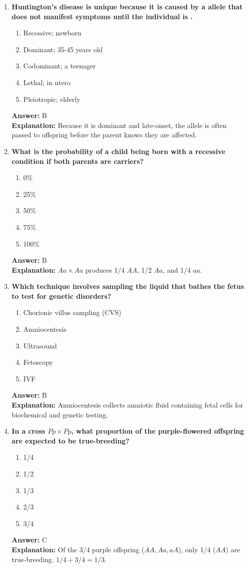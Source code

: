 \documentclass[11pt, a4paper]{article}
\begin{document}
\begin{enumerate}[leftmargin=*, label=\arabic*.]
\item \textbf{Huntington's disease is unique because it is caused by a \underline{\hspace{1cm}} allele that does not manifest symptoms until the individual is \underline{\hspace{1cm}}.}
\begin{enumerate}[label=\Alph*.]
\item Recessive; newborn
\item Dominant; 35-45 years old
\item Codominant; a teenager
\item Lethal; in utero
\item Pleiotropic; elderly
\end{enumerate}
\textbf{Answer:} B \\
\textbf{Explanation:} Because it is dominant and late-onset, the allele is often passed to offspring before the parent knows they are affected.

\item \textbf{What is the probability of a child being born with a recessive condition if both parents are carriers?}
\begin{enumerate}[label=\Alph*.]
\item 0\%
\item 25\%
\item 50\%
\item 75\%
\item 100\%
\end{enumerate}
\textbf{Answer:} B \\
\textbf{Explanation:} $Aa \times Aa$ produces 1/4 $AA$, 1/2 $Aa$, and 1/4 $aa$.

\item \textbf{Which technique involves sampling the liquid that bathes the fetus to test for genetic disorders?}
\begin{enumerate}[label=\Alph*.]
\item Chorionic villus sampling (CVS)
\item Amniocentesis
\item Ultrasound
\item Fetoscopy
\item IVF
\end{enumerate}
\textbf{Answer:} B \\
\textbf{Explanation:} Amniocentesis collects amniotic fluid containing fetal cells for biochemical and genetic testing.

\item \textbf{In a cross $Pp \times Pp$, what proportion of the purple-flowered offspring are expected to be true-breeding?}
\begin{enumerate}[label=\Alph*.]
\item 1/4
\item 1/2
\item 1/3
\item 2/3
\item 3/4
\end{enumerate}
\textbf{Answer:} C \\
\textbf{Explanation:} Of the 3/4 purple offspring ($AA, Aa, aA$), only 1/4 ($AA$) are true-breeding. $1/4 \div 3/4 = 1/3$.


\end{enumerate}
\end{document}
